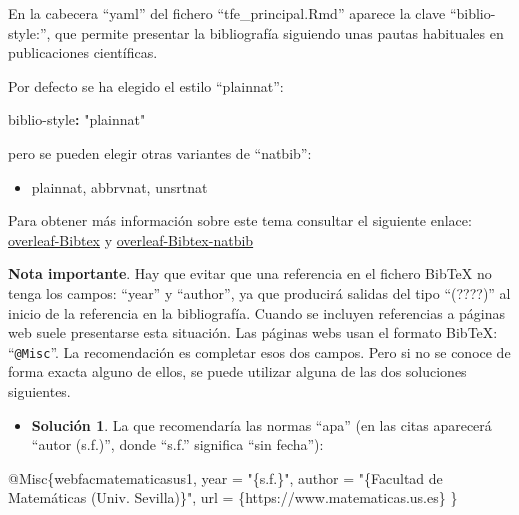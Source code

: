 \documentclass[12pt,a4paper,oneside,]{book}
\newenvironment{Shaded}{\begin{snugshade}}{\end{snugshade}}
\newcommand{\AttributeTok}[1]{\textcolor[rgb]{0.77,0.63,0.00}{#1}}
\newcommand{\CommentTok}[1]{\textcolor[rgb]{0.56,0.35,0.01}{\textit{#1}}}
\newcommand{\DataTypeTok}[1]{\textcolor[rgb]{0.13,0.29,0.53}{#1}}
\newcommand{\FunctionTok}[1]{\textcolor[rgb]{0.00,0.00,0.00}{#1}}
\newcommand{\KeywordTok}[1]{\textcolor[rgb]{0.13,0.29,0.53}{\textbf{#1}}}
\newcommand{\NormalTok}[1]{#1}
\newcommand{\OtherTok}[1]{\textcolor[rgb]{0.56,0.35,0.01}{#1}}
\newcommand{\StringTok}[1]{\textcolor[rgb]{0.31,0.60,0.02}{#1}}
\newcommand{\VariableTok}[1]{\textcolor[rgb]{0.00,0.00,0.00}{#1}}
\providecommand{\tightlist}{%
  \setlength{\itemsep}{0pt}\setlength{\parskip}{0pt}}
\numberwithin{dummy}{section}
\theoremstyle{ocrenumbox}
\theoremstyle{blacknumex}
\theoremstyle{blacknumbox}
\theoremstyle{ocrenum}
\theoremstyle{ocrenum}
\begin{document}
\normalsize

En la cabecera ``yaml'' del fichero ``tfe\_principal.Rmd'' aparece la
clave ``biblio-style:'', que permite presentar la bibliografía siguiendo
unas pautas habituales en publicaciones científicas.

Por defecto se ha elegido el estilo ``plainnat'':

\begin{Shaded}
\begin{Highlighting}[]
\FunctionTok{biblio{-}style}\KeywordTok{:}\AttributeTok{ }\StringTok{"plainnat"}\AttributeTok{ }
\end{Highlighting}
\end{Shaded}

pero se pueden elegir otras variantes de ``natbib'':

\begin{itemize}
\tightlist
\item
  plainnat, abbrvnat, unsrtnat
\end{itemize}

Para obtener más información sobre este tema consultar el siguiente
enlace:
\href{https://www.overleaf.com/learn/latex/Bibtex_bibliography_styles}{overleaf-Bibtex}
y
\href{https://www.overleaf.com/learn/latex/Bibliography_management_with_natbib}{overleaf-Bibtex-natbib}

\textbf{Nota importante}. Hay que evitar que una referencia en el
fichero BibTeX no tenga los campos: ``year'' y ``author'', ya que
producirá salidas del tipo ``(????)'' al inicio de la referencia en la
bibliografía. Cuando se incluyen referencias a páginas web suele
presentarse esta situación. Las páginas webs usan el formato BibTeX:
``\texttt{@Misc}''. La recomendación es completar esos dos campos. Pero
si no se conoce de forma exacta alguno de ellos, se puede utilizar
alguna de las dos soluciones siguientes.

\begin{itemize}
\tightlist
\item
  \textbf{Solución 1}. La que recomendaría las normas ``apa'' (en las
  citas aparecerá ``autor (s.f.)'', donde ``s.f.'' significa ``sin
  fecha''):
\end{itemize}

\begin{Shaded}
\begin{Highlighting}[]
\VariableTok{@Misc}\NormalTok{\{}\OtherTok{webfacmatematicasus1}\NormalTok{,}
  \DataTypeTok{year}\NormalTok{ = "}\StringTok{\{s.f.\}}\NormalTok{",}
  \DataTypeTok{author}\NormalTok{ = "}\StringTok{\{Facultad de Matemáticas (Univ. Sevilla)\}}\NormalTok{",}
  \DataTypeTok{url}\NormalTok{ = \{https://www.matematicas.us.es\}}
\NormalTok{\}}\CommentTok{ }
\end{Highlighting}
\end{Shaded}
\end{document}
